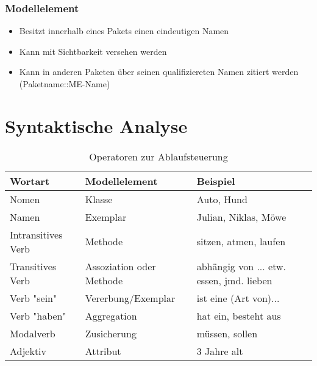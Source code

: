 \subsubsection{Modellelement}
\begin{itemize}
    \item Besitzt innerhalb eines Pakets einen eindeutigen Namen
    \item Kann mit Sichtbarkeit versehen werden
    \item Kann in anderen Paketen über seinen qualifiziereten Namen zitiert werden (Paketname::ME-Name)
\end{itemize}


\section{Syntaktische Analyse}
\begin{table}[h]
\begin{tabular}{l|l|l}
Wortart            & Modellelement            & Beispiel                                 \\
\hline
Nomen              & Klasse                   & Auto, Hund                               \\
Namen              & Exemplar                 & Julian, Niklas, Möwe                     \\
Intransitives Verb & Methode                  & sitzen, atmen, laufen                    \\
Transitives Verb   & Assoziation oder Methode & abhängig von ... etw. essen, jmd. lieben \\
Verb "sein"        & Vererbung/Exemplar       & ist eine (Art von)...                    \\
Verb "haben"       & Aggregation              & hat ein, besteht aus                     \\
Modalverb          & Zusicherung              & müssen, sollen                           \\
Adjektiv           & Attribut                 & 3 Jahre alt               
\end{tabular}
\caption{Operatoren zur Ablaufsteuerung}
\label{tab:ablaufsteuerung}
\end{table}